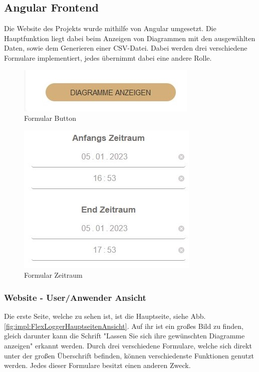 \subsection{Angular Frontend}
Die Website des Projekts wurde mithilfe von Angular umgesetzt. Die Hauptfunktion liegt dabei beim Anzeigen von Diagrammen mit den ausgewählten Daten, sowie dem Generieren einer CSV-Datei. Dabei werden drei verschiedene Formulare implementiert, jedes übernimmt dabei eine andere Rolle.


\begin{figure}
    \centering
    \includegraphics[scale=1]{pics/FlexLoggerWebsiteFormulare_button.jpg}
    \caption{Formular Button}
    \label{fig:impl:FlexLoggerHauptseitenAnsichtButton}
    \end{figure}
    
    
    \begin{figure}
    \centering
    \includegraphics[scale=1]{pics/FlexLoggerWebsiteFormulare_zeitraum.jpg}
    \caption{Formular Zeitraum}
    \label{fig:impl:FlexLoggerHauptseitenAnsichtZeitraum}
    \end{figure}

\subsubsection{Website - User/Anwender Ansicht}
Die erste Seite, welche zu sehen ist, ist die Hauptseite, siehe Abb. \ref{fig:impl:FlexLoggerHauptseitenAnsicht}. Auf ihr ist ein großes Bild zu finden, gleich darunter kann die Schrift "Lassen Sie sich ihre gewünschten Diagramme anzeigen" erkannt werden.
Durch drei verschiedene Formulare, welche sich direkt unter der großen Überschrift befinden, können verschiedenste Funktionen genutzt werden. Jedes dieser Formulare besitzt einen anderen Zweck.


